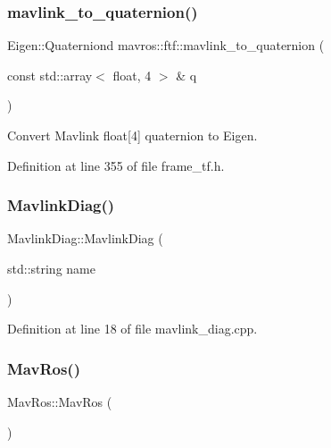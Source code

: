 \subsubsection{\texorpdfstring{mavlink\_to\_quaternion()}{mavlink\_to\_quaternion()}}
{\footnotesize\ttfamily Eigen\+::\+Quaterniond mavros\+::ftf\+::mavlink\+\_\+to\+\_\+quaternion (\begin{DoxyParamCaption}\item[{const std\+::array$<$ float, 4 $>$ \&}]{q }\end{DoxyParamCaption})\hspace{0.3cm}{\ttfamily [inline]}}



Convert Mavlink float\mbox{[}4\mbox{]} quaternion to Eigen. 



Definition at line 355 of file frame\+\_\+tf.\+h.

\mbox{\label{group__nodelib_ga7e52b64de8101152cb7da231bb6f0e6b}} 
\subsubsection{\texorpdfstring{MavlinkDiag()}{MavlinkDiag()}}
{\footnotesize\ttfamily Mavlink\+Diag\+::\+Mavlink\+Diag (\begin{DoxyParamCaption}\item[{std\+::string}]{name }\end{DoxyParamCaption})\hspace{0.3cm}{\ttfamily [explicit]}}



Definition at line 18 of file mavlink\+\_\+diag.\+cpp.

\mbox{\label{group__nodelib_gaa8188d2a9ae2324e2a91f2ec12077715}} 
\subsubsection{\texorpdfstring{MavRos()}{MavRos()}}
{\footnotesize\ttfamily Mav\+Ros\+::\+Mav\+Ros (\begin{DoxyParamCaption}{ }\end{DoxyParamCaption})}



